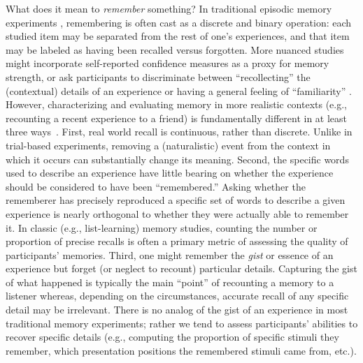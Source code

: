 \documentclass{article}
\begin{document}
What does it mean to \textit{remember} something? In traditional episodic memory experiments \citep[e.g., list-learning or trial-based experiments;][]{Murd62a, Kaha96}, remembering is often cast as a discrete and binary operation: each studied item may be separated from the rest of one's experiences, and that item may be labeled as having been recalled versus forgotten. More nuanced studies might incorporate self-reported confidence measures as a proxy for memory strength, or ask participants to discriminate between ``recollecting'' the (contextual) details of an experience or having a general feeling of ``familiarity'' \citep{Yone02}. However, characterizing and evaluating memory in more realistic contexts (e.g., recounting a recent experience to a friend) is fundamentally different in at least three ways~\citep[also see][for a review]{KoriGold94}.  First, real world recall is continuous, rather than discrete.  Unlike in trial-based experiments, removing a (naturalistic) event from the context in which it occurs can substantially change its meaning.  Second, the specific words used to describe an experience have little bearing on whether the experience should be considered to have been ``remembered.''  Asking whether the rememberer has precisely reproduced a specific set of words to describe a given experience is nearly orthogonal to whether they were actually able to remember it.  In classic (e.g., list-learning) memory studies, counting the number or proportion of precise recalls is often a primary metric of assessing the quality of participants' memories.  Third, one might remember the \textit{gist} or essence of an experience but forget (or neglect to recount) particular details.  Capturing the gist of what happened is typically the main ``point'' of recounting a memory to a listener whereas, depending on the circumstances, accurate recall of any specific detail may be irrelevant.  There is no analog of the gist of an experience in most traditional memory experiments; rather we tend to assess participants' abilities to recover specific details (e.g., computing the proportion of specific stimuli they remember, which presentation positions the remembered stimuli came from, etc.).
\end{document}
